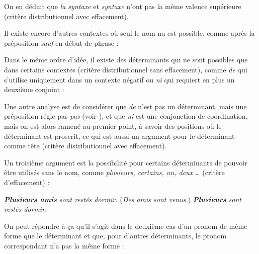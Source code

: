 On en déduit que \textit{la syntaxe} et \textit{syntaxe} n’ont pas la même valence supérieure (critère distributionnel avec effacement).

Il existe encore d’autres contextes où seul le nom nu est possible, comme après la préposition \textit{sauf} en début de phrase :

\ea
  \z
\z

Dans le même ordre d’idée, il existe des déterminants qui ne sont possibles que dans certains contextes (critère distributionnel sans effacement), comme \textit{de} qui s’utilise uniquement dans un contexte négatif ou \textit{ni} qui requiert en plus un deuxième conjoint :

\ea
  \z
\z

Une autre analyse est de considérer que \textit{de} n’est pas un déterminant, mais une préposition régie par \textit{pas} (voir ), et que \textit{ni} est une conjonction de coordination, mais on est alors ramené au premier point, à savoir des positions où le déterminant est proscrit, ce qui est aussi un argument pour le déterminant comme tête (critère distributionnel avec effacement).



Un troisième argument est la possibilité pour certains déterminants de pouvoir être utilisés sans le nom, comme \textit{plusieurs, certains, un, deux …} (critère d’effacement) :

\ea
  \ea \textit{\textbf{{Plusieurs amis}}  {sont restés dormir.}}
  \ex (\textit{{Des amis sont venus.}}) \textit{\textbf{{Plusieurs}}  {sont restés dormir.}}
  \z
\z

On peut répondre à ça qu’il s’agit dans le deuxième cas d’un pronom de même forme que le déterminant et que, pour d’autres déterminants, le pronom correspondant n’a pas la même forme :

